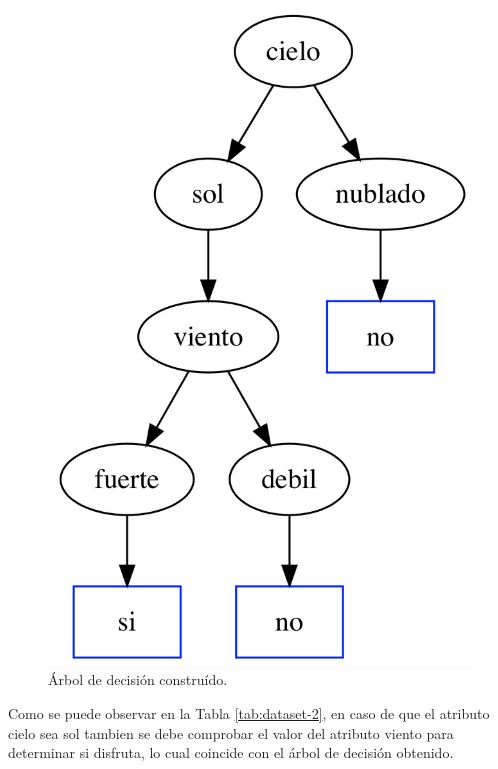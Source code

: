 \documentclass[a4paper]{article}
\begin{document}
\begin{figure}[h]
  \centering
    \includegraphics[scale=0.4]{img/tree2.png}
  \caption{Árbol de decisión construído.}
  \label{ej1-tree2}
\end{figure}

Como se puede observar en la Tabla \ref{tab:dataset-2}, en caso de que el atributo cielo sea sol tambien se debe comprobar el valor del atributo viento para determinar si disfruta, lo cual coincide con el árbol de decisión obtenido.
\end{document}
